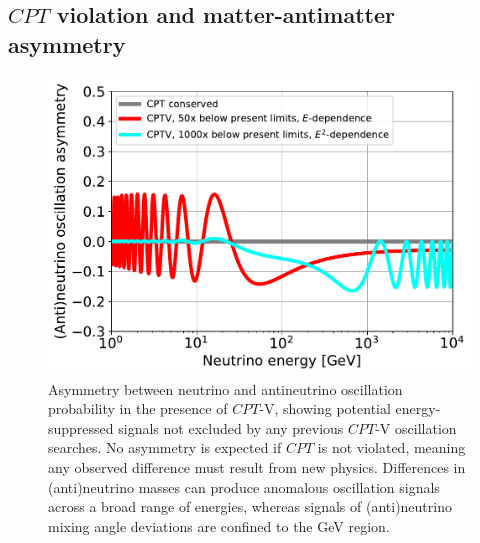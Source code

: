 \documentclass[a4paper,11pt]{article}
\begin{document}
\subsection{$CPT$ violation and matter-antimatter asymmetry}


\begin{figure} %
    \centering
    \includegraphics[trim=0.0cm 0.0cm 0.cm 0.0cm, clip=true, width=1.\linewidth]{images/CPTv_IceCube.pdf}
	\caption{Asymmetry between neutrino and antineutrino oscillation probability in the presence of $CPT$-V, showing potential energy-suppressed signals not excluded by any previous $CPT$-V oscillation searches. No asymmetry is expected if $CPT$ is not violated, meaning any observed difference must result from new physics. Differences in (anti)neutrino masses can produce anomalous oscillation signals across a broad range of energies, whereas signals of (anti)neutrino mixing angle deviations are confined to the GeV region.}
	\label{fig:$CPT$v}
\end{figure}
\end{document}
